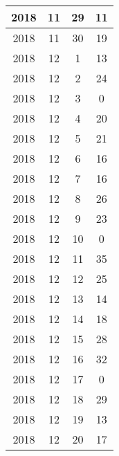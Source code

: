 \begin{longtable} {|c|c|c|c|}
\hline
2018         & 11           & 29           & 11                        \\ 
\hline
2018         & 11           & 30           & 19                        \\ 
\hline
2018         & 12           & 1            & 13                        \\ 
\hline
2018         & 12           & 2            & 24                        \\ 
\hline
2018         & 12           & 3            & 0                         \\ 
\hline
2018         & 12           & 4            & 20                        \\ 
\hline
2018         & 12           & 5            & 21                        \\ 
\hline
2018         & 12           & 6            & 16                        \\ 
\hline
2018         & 12           & 7            & 16                        \\ 
\hline
2018         & 12           & 8            & 26                        \\ 
\hline
2018         & 12           & 9            & 23                        \\ 
\hline
2018         & 12           & 10           & 0                         \\ 
\hline
2018         & 12           & 11           & 35                        \\ 
\hline
2018         & 12           & 12           & 25                        \\ 
\hline
2018         & 12           & 13           & 14                        \\ 
\hline
2018         & 12           & 14           & 18                        \\ 
\hline
2018         & 12           & 15           & 28                        \\ 
\hline
2018         & 12           & 16           & 32                        \\ 
\hline
2018         & 12           & 17           & 0                         \\ 
\hline
2018         & 12           & 18           & 29                        \\ 
\hline
2018         & 12           & 19           & 13                        \\ 
\hline
2018         & 12           & 20           & 17                        \\ 

\end{longtable}
